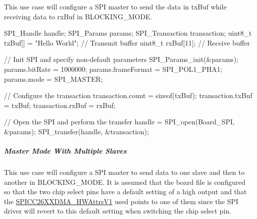 This use case will configure a S\+P\+I master to send the data in tx\+Buf while receiving data to rx\+Buf in B\+L\+O\+C\+K\+I\+N\+G\+\_\+\+M\+O\+D\+E. 
\begin{DoxyCode}
SPI_Handle handle;
SPI_Params params;
SPI_Transaction transaction;
uint8\_t txBuf[] = \textcolor{stringliteral}{"Hello World"};    \textcolor{comment}{// Transmit buffer}
uint8\_t rxBuf[11];                  \textcolor{comment}{// Receive buffer}

\textcolor{comment}{// Init SPI and specify non-default parameters}
SPI_Params_init(&params);
params.bitRate     = 1000000;
params.frameFormat = SPI_POL1_PHA1;
params.mode        = SPI_MASTER;

\textcolor{comment}{// Configure the transaction}
transaction.count = \textcolor{keyword}{sizeof}(txBuf);
transaction.txBuf = txBuf;
transaction.rxBuf = rxBuf;

\textcolor{comment}{// Open the SPI and perform the transfer}
handle = SPI_open(Board\_SPI, &params);
SPI_transfer(handle, &transaction);
\end{DoxyCode}


\subparagraph*{Master Mode With Multiple Slaves\label{_s_p_i_c_c26_x_x_d_m_a_8h_USE_CASE_MMMS}%
\hypertarget{_s_p_i_c_c26_x_x_d_m_a_8h_USE_CASE_MMMS}{}%
}

This use case will configure a S\+P\+I master to send data to one slave and then to another in B\+L\+O\+C\+K\+I\+N\+G\+\_\+\+M\+O\+D\+E. It is assumed that the board file is configured so that the two chip select pins have a default setting of a high output and that the \hyperlink{struct_s_p_i_c_c26_x_x_d_m_a___h_w_attrs_v1}{S\+P\+I\+C\+C26\+X\+X\+D\+M\+A\+\_\+\+H\+W\+Attrs\+V1} used points to one of them since the S\+P\+I driver will revert to this default setting when switching the chip select pin.



